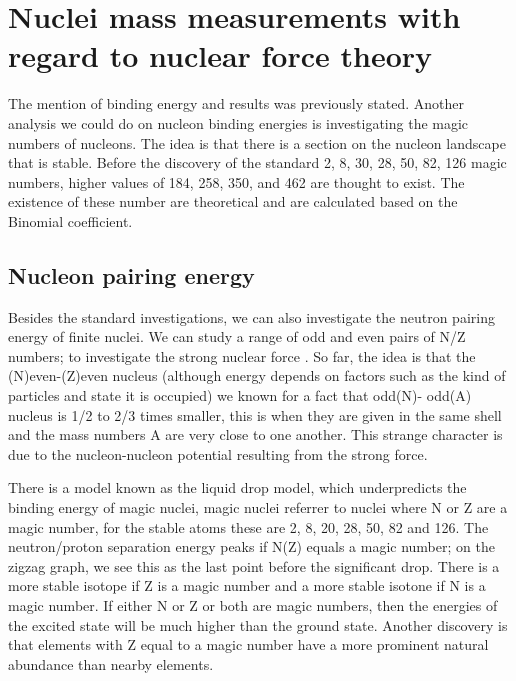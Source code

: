 \section{Nuclei mass measurements with regard to nuclear force theory}
The mention of binding energy and results was previously stated.
Another analysis we could do on nucleon binding energies is investigating the magic numbers of nucleons.
The idea is that there is a section on the nucleon landscape that is stable.
Before the discovery of the standard 2, 8, 30, 28, 50, 82, 126 magic numbers, higher values of 184, 258, 350, and 462 are thought to exist. 
The existence of these number are theoretical and are calculated based on the Binomial coefficient.

\subsection{Nucleon pairing energy}
Besides the standard investigations, we can also investigate the neutron pairing energy of finite nuclei.
We can study a range of odd and even pairs of N/Z numbers; to investigate the strong nuclear force \cite{fred_neutron_2019}.
So far, the idea is that the (N)even-(Z)even nucleus (although energy depends on factors such as the kind of particles and state it is occupied) we known for a fact that odd(N)- odd(A) nucleus is 1/2 to 2/3 times smaller, this is when they are given in the same shell and the mass numbers A are very close to one another.
This strange character is due to the nucleon-nucleon potential resulting from the strong force. \cite{jensen_elementary_1955}

There is a model known as the liquid drop model, which underpredicts the binding energy of magic nuclei, magic nuclei referrer to nuclei where N or Z are a magic number, for the stable atoms these are 2, 8, 20, 28, 50, 82 and 126.
The neutron/proton separation energy peaks if N(Z) equals a magic number; on the zigzag graph, we see this as the last point before the significant drop.
There is a more stable isotope if Z is a magic number and a more stable isotone if N is a magic number.
If either N or Z or both are magic numbers, then the energies of the excited state will be much higher than the ground state.
Another discovery is that elements with Z equal to a magic number have a more prominent natural abundance than nearby elements. \cite{kumawat_description_2018}

